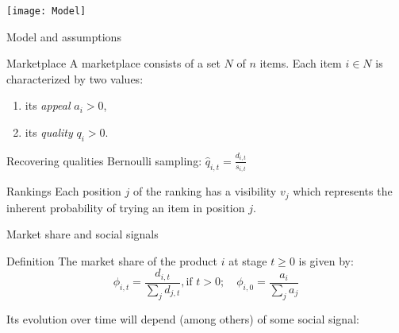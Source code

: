 	
\addtocounter{framenumber}{-1}
{	
\begin{frame}[c]
\begin{center}

	\vspace{10em}
	 \texttt{[image: Model]}\\
	\vspace{.5em}
	
\end{center}
\end{frame}
}
	
	

\begin{frame}[c]{Model and assumptions}{}
	\begin{block}{Marketplace}
		A marketplace consists of a set $N$ of $n$ items. Each item $i\in N$ is characterized by two values:
		\begin{enumerate}
			\item its {\em appeal} $a_i > 0$,%
			\item its {\em quality} $q_i > 0$.%
		\end{enumerate}	
	\end{block}

	\begin{alertblock}{Recovering qualities}
		Bernoulli sampling: $\hat{q}_{i,t}=\frac{d_{i,t}}{s_{i,t}}$
	\end{alertblock}
	
	\begin{block}{Rankings}
		 Each position $j$ of the ranking has a visibility $v_j$ which represents
the inherent probability of trying an item in position $j$.
	\end{block}
\end{frame}



\begin{frame}[c]{Market share and social signals}

\begin{block}{Definition}
The market share of the product $i$ at stage $t\geq 0$ is given by:
$$\phi_{i,t}=\dfrac{d_{i,t}}{\sum_j d_{j,t}}, \mbox{if } t>0;\quad \phi_{i,0}=\dfrac{a_{i}}{\sum_j a_{j}} $$
\end{block}

Its evolution over time will depend (among others) of some social signal:
\end{frame}


